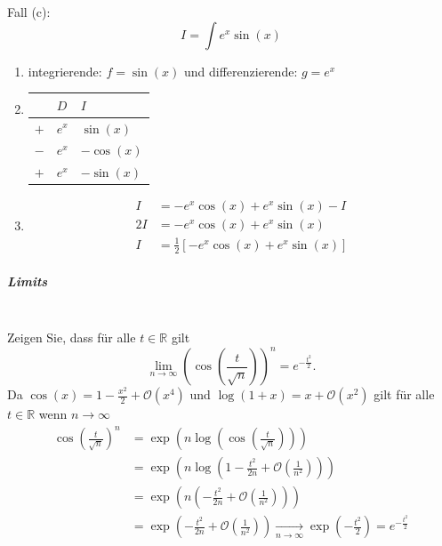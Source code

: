 \documentclass[7pt,landscape, margin = 0.1mm]{article}
\begin{document}
\begin{multicols}{4}
\begin{flushleft}
\begin{flushleft}
\begin{enumerate}
\end{enumerate}
Fall (c):\\
$$I= \int e^x \sin(x) $$
\begin{enumerate}
\item integrierende: $f=\sin(x)$ und differenzierende: $g=e^x$
\item 
\begin{center}

\begin{tabular}{l|ll}
    & $D$ & $I$ \\ \hline
$+$   & $e^x$   & $\sin(x)$   \\
$-$   &  $e^x$ &  $-\cos(x)$ \\ 
$+$   & $e^x$  &   $- \sin(x)$ \\ 

\end{tabular}
\end{center}
\item \begin{align*}
I &= -e^{x} \cos(x) + e^x \sin(x) - I \\  2 I &= -e^{x} \cos(x) + e^x \sin(x)\\
I &= \frac{1}{2} \left[ -e^{x} \cos(x) + e^x \sin(x)\right]
\end{align*}
\end{enumerate}

\vspace{1mm} \hline \vspace{1mm}
\subparagraph{Limits }\\
Zeigen Sie, dass für alle $t \in \mathbb{R}$ gilt
$$
\lim _{n \rightarrow \infty}\left(\cos \left(\frac{t}{\sqrt{n}}\right)\right)^n=e^{-\frac{t^2}{2}} .
$$
Da $\cos (x)=1-\frac{x^2}{2}+\mathcal{O}\left(x^4\right)$ und $\log (1+x)=x+\mathcal{O}\left(x^2\right)$ gilt für alle $t \in \mathbb{R}$ wenn $n \rightarrow \infty$
$$
\begin{aligned}
\cos \left(\frac{t}{\sqrt{n}}\right)^n & =\exp \left(n \log \left(\cos \left(\frac{t}{\sqrt{n}}\right)\right)\right) \\
& =\exp \left(n \log \left(1-\frac{t^2}{2 n}+\mathcal{O}\left(\frac{1}{n^2}\right)\right)\right) \\
& =\exp \left(n\left(-\frac{t^2}{2 n}+\mathcal{O}\left(\frac{1}{n^2}\right)\right)\right) \\
& =\exp \left(-\frac{t^2}{2 n}+\mathcal{O}\left(\frac{1}{n^2}\right)\right) \underset{n \rightarrow \infty}{\longrightarrow} \exp \left(-\frac{t^2}{2}\right)=e^{-\frac{t^2}{2}}
\end{aligned}
$$


\end{flushleft}
\end{flushleft}
\end{multicols}
\end{document}
